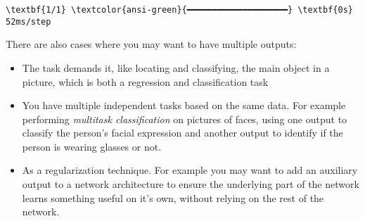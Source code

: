 \documentclass[12pt letter]{report}
\begin{document}
    \begin{Verbatim}[commandchars=\\\{\}]
\textbf{1/1} \textcolor{ansi-green}{━━━━━━━━━━━━━━━━━━━━} \textbf{0s} 52ms/step
    \end{Verbatim}

There are also cases where you may want to have multiple outputs:

\begin{itemize}
\item
  The task demands it, like locating and classifying, the main object in
  a picture, which is both a regression and classification task
\item
  You have multiple independent tasks based on the same data. For
  example performing \emph{multitask classification} on pictures of
  faces, using one output to classify the person's facial expression and
  another output to identify if the person is wearing glasses or not.
\item
  As a regularization technique. For example you may want to add an
  auxiliary output to a network architecture to ensure the underlying
  part of the network learns something useful on it's own, without
  relying on the rest of the network.
\end{itemize}
\end{document}
